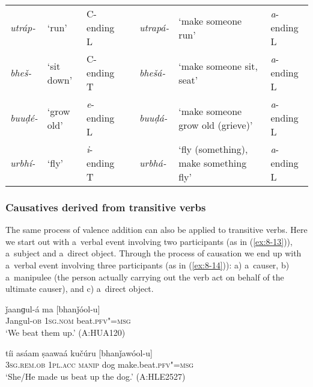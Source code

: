 \begin{table}[H]
\begin{tabularx}{\textwidth}{ l  P{10mm}  l  l  l  Q  l }

\textit{utráp-} &
`run' &
C-ending L &
\centering {\textgreater} &
\textit{utrapá-} &
`make someone run' &
\textit{a}-ending L\\
\textit{bheš-} &
`sit down' &
C-ending T &
\centering {\textgreater} &
\textit{bhešá-} &
`make someone sit, seat' &
\textit{a}-ending L\\
\textit{buuḍé-} &
`grow old' &
\textit{e}-ending L &
\centering {\textgreater}\par
&
\textit{buuḍá-} &
`make someone grow old (grieve)' &
\textit{a}-ending L\\
\textit{urbhí-} &
`fly'
&
{\textit{i}-ending T}
&
\centering {\textgreater}\par
&
\textit{urbhá-}
&
`fly (something), make something fly' &
{\textit{a}-ending L}
\\
\end{tabularx}
\end{table}

\subsubsection*{Causatives derived from transitive verbs}

The same process of valence addition can also be applied to transitive verbs. Here we start out with a~verbal event involving two participants (as in (\ref{ex:8-13})), a~subject and a~direct object. Through the process of causation we end up with a~verbal event involving three participants (as in (\ref{ex:8-14})): a) a~causer, b) a~manipulee (the person actually carrying out the verb act on behalf of the ultimate causer), and c) a~direct object.

\begin{exe}
\ex
\label{ex:8-13}
\gll ǰaanɡul-á ma [bhanǰóol-u] \\
Jangul-\textsc{ob} \textsc{1sg.nom} beat.\textsc{pfv"=msg} \\
\glt `We beat them up.' (A:HUA120)
\end{exe}
\begin{exe}
\ex
\label{ex:8-14}
\gll tíi asáam ṣaawaá kučúru [bhanǰawóol-u] \\
\textsc{3sg.rem.ob} \textsc{1pl.acc} \textsc{manip} dog make.beat.\textsc{pfv"=msg} \\
\glt `She/He made us beat up the dog.' (A:HLE2527)
\end{exe}


